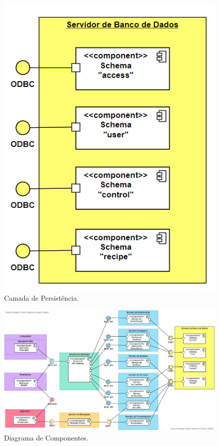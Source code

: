 \begin{figure}[H]
    \centering
    \includegraphics[scale=0.50]{figuras/projeto/software/camada_persistencia.PNG}
    \caption{Camada de Persistência.}
    \label{fig:camada_persistencia}
\end{figure}

\begin{figure}[ht]
    \centering
    \includegraphics[scale=0.50, angle=270]{figuras/projeto/software/diagrama_componentes.png}
    \caption{Diagrama de Componentes.}
    \label{fig:diagrama_componentes}
\end{figure}


